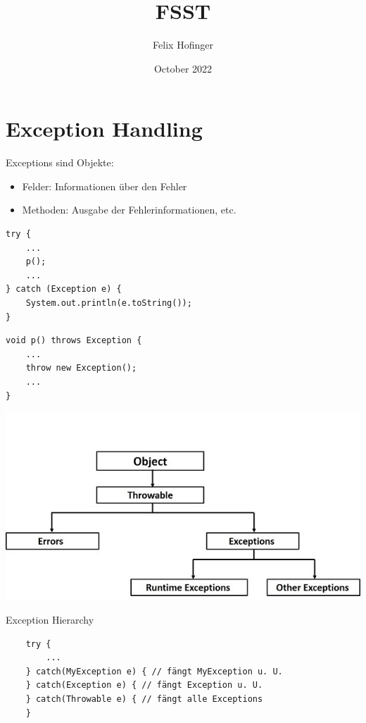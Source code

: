 \documentclass{article}
\title{FSST}
\author{Felix Hofinger}
\date{October 2022}
\begin{document}
\maketitle
\newpage
\tableofcontents
\newpage

\section{Exception Handling}

Exceptions sind Objekte:
\begin{itemize}
    \item Felder: Informationen über den Fehler
    \item Methoden: Ausgabe der Fehlerinformationen, etc.
\end{itemize}

\vspace{1em}
\begin{verbatim}
try {
    ...
    p();
    ...
} catch (Exception e) {
    System.out.println(e.toString());
}
\end{verbatim}
\begin{verbatim}
void p() throws Exception {
    ...
    throw new Exception();
    ...
}
\end{verbatim}

\begin{table}[!htbp]
    \centering
    \includegraphics[scale=0.5]{1/exception_hierarchy.jpg}
    \caption{Exception Hierarchy}
    \label{tab:exception_hierarchy}
\end{table}

\begin{verbatim}
    try {
        ...
    } catch(MyException e) { // fängt MyException u. U.
    } catch(Exception e) { // fängt Exception u. U.
    } catch(Throwable e) { // fängt alle Exceptions
    }
\end{verbatim}
\end{document}
